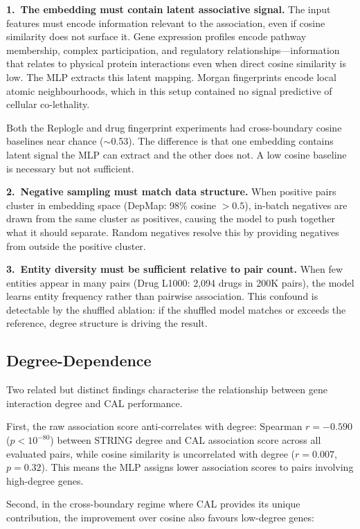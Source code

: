\documentclass[11pt]{article}
\begin{document}
\textbf{1.\ The embedding must contain latent associative signal.} The input features must encode information relevant to the association, even if cosine similarity does not surface it. Gene expression profiles encode pathway membership, complex participation, and regulatory relationships---information that relates to physical protein interactions even when direct cosine similarity is low. The MLP extracts this latent mapping. Morgan fingerprints encode local atomic neighbourhoods, which in this setup contained no signal predictive of cellular co-lethality.

Both the Replogle and drug fingerprint experiments had cross-boundary cosine baselines near chance ($\sim$0.53). The difference is that one embedding contains latent signal the MLP can extract and the other does not. A low cosine baseline is necessary but not sufficient.

\textbf{2.\ Negative sampling must match data structure.} When positive pairs cluster in embedding space (DepMap: 98\% cosine $> 0.5$), in-batch negatives are drawn from the same cluster as positives, causing the model to push together what it should separate. Random negatives resolve this by providing negatives from outside the positive cluster.

\textbf{3.\ Entity diversity must be sufficient relative to pair count.} When few entities appear in many pairs (Drug L1000: 2,094 drugs in 200K pairs), the model learns entity frequency rather than pairwise association. This confound is detectable by the shuffled ablation: if the shuffled model matches or exceeds the reference, degree structure is driving the result.

\subsection{Degree-Dependence}
\label{sec:degree}

Two related but distinct findings characterise the relationship between gene interaction degree and CAL performance.

First, the raw association score anti-correlates with degree: Spearman $r = -0.590$ ($p < 10^{-80}$) between STRING degree and CAL association score across all evaluated pairs, while cosine similarity is uncorrelated with degree ($r = 0.007$, $p = 0.32$). This means the MLP assigns lower association scores to pairs involving high-degree genes.

Second, in the cross-boundary regime where CAL provides its unique contribution, the improvement over cosine also favours low-degree genes:
\end{document}
